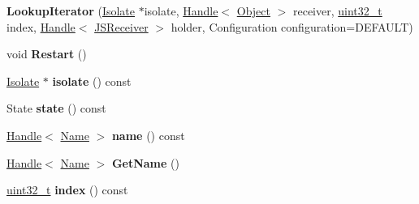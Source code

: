 \begin{DoxyCompactItemize}
\item 
\mbox{\label{classv8_1_1internal_1_1LookupIterator_ae5651124d18e96dbd4dbcb7a25f2abde}} 
{\bfseries Lookup\+Iterator} (\mbox{\hyperlink{classv8_1_1internal_1_1Isolate}{Isolate}} $\ast$isolate, \mbox{\hyperlink{classv8_1_1internal_1_1Handle}{Handle}}$<$ \mbox{\hyperlink{classv8_1_1internal_1_1Object}{Object}} $>$ receiver, \mbox{\hyperlink{classuint32__t}{uint32\+\_\+t}} index, \mbox{\hyperlink{classv8_1_1internal_1_1Handle}{Handle}}$<$ \mbox{\hyperlink{classv8_1_1internal_1_1JSReceiver}{J\+S\+Receiver}} $>$ holder, Configuration configuration=D\+E\+F\+A\+U\+LT)
\item 
\mbox{\label{classv8_1_1internal_1_1LookupIterator_a6789f0bd0560d2f11e5b0b24b4ec5113}} 
void {\bfseries Restart} ()
\item 
\mbox{\label{classv8_1_1internal_1_1LookupIterator_aeb66f90bcb1add987938e1740def38ba}} 
\mbox{\hyperlink{classv8_1_1internal_1_1Isolate}{Isolate}} $\ast$ {\bfseries isolate} () const
\item 
\mbox{\label{classv8_1_1internal_1_1LookupIterator_a24e611b805657d1625446318292c9760}} 
State {\bfseries state} () const
\item 
\mbox{\label{classv8_1_1internal_1_1LookupIterator_a359aa31638342a8981d725eead1849e8}} 
\mbox{\hyperlink{classv8_1_1internal_1_1Handle}{Handle}}$<$ \mbox{\hyperlink{classv8_1_1internal_1_1Name}{Name}} $>$ {\bfseries name} () const
\item 
\mbox{\label{classv8_1_1internal_1_1LookupIterator_a143353a00b2b70eb1cbbba358a6daffc}} 
\mbox{\hyperlink{classv8_1_1internal_1_1Handle}{Handle}}$<$ \mbox{\hyperlink{classv8_1_1internal_1_1Name}{Name}} $>$ {\bfseries Get\+Name} ()
\item 
\mbox{\label{classv8_1_1internal_1_1LookupIterator_a775aafcf733a44b36da08045d68db7c2}} 
\mbox{\hyperlink{classuint32__t}{uint32\+\_\+t}} {\bfseries index} () const
\item 
\mbox{\label{classv8_1_1internal_1_1LookupIterator_a75925d33e955b0a316ce94399da56dfc}} 

\end{DoxyCompactItemize}
